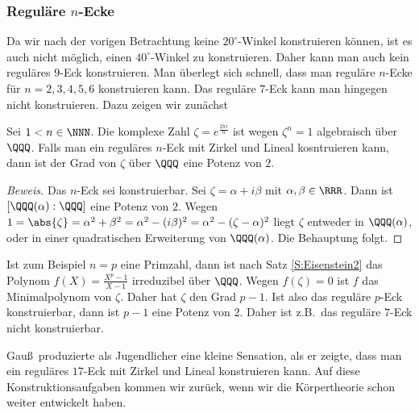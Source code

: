 \documentclass[12pt,a4paper,twoside]{article}
\begin{document}
\subsubsection{Regul\"are $n$-Ecke}
Da wir nach der vorigen Betrachtung keine $20^\circ$-Winkel konstruieren
k\"onnen, ist es auch nicht m\"oglich, einen $40^\circ$-Winkel zu
konstruieren. Daher kann man auch kein regul\"ares $9$-Eck konstruieren. Man
\"uberlegt sich schnell, dass man regul\"are $n$-Ecke f\"ur $n=2,3,4,5,6$
konstruieren kann. Das regul\"are $7$-Eck kann man hingegen nicht
konstruieren. Dazu zeigen wir zun\"achst
\begin{Lemma}\label{L:nEck}
  Sei $1<n\in\NNN$. Die komplexe Zahl $\zeta=e^{\frac{2\pi i}{n}}$ ist wegen
  $\zeta^n=1$ algebraisch \"uber $\QQQ$. Falls man ein regul\"ares $n$-Eck mit
  Zirkel und Lineal kosntruieren kann, dann ist der Grad von $\zeta$ \"uber
  $\QQQ$ eine Potenz von $2$.
\end{Lemma}
\begin{proof}[Beweis]
  Das $n$-Eck sei konstruierbar. Sei $\zeta=\alpha+i\beta$ mit
  $\alpha,\beta\in\RRR$. Dann ist $[\QQQ(\alpha):\QQQ]$ eine Potenz von $2$.
  Wegen $1=\abs{\zeta}=\alpha^2+\beta^2=\alpha^2-(i\beta)^2=
  \alpha^2-(\zeta-\alpha)^2$ liegt $\zeta$ entweder in $\QQQ(\alpha)$, oder in
  einer quadratischen Erweiterung von $\QQQ(\alpha)$. Die Behauptung folgt.
\end{proof}
Ist zum Beispiel $n=p$ eine Primzahl, dann ist nach Satz \ref{S:Eisenstein2}
das Polynom $f(X)=\frac{X^p-1}{X-1}$ irreduzibel \"uber $\QQQ$. Wegen
$f(\zeta)=0$ ist $f$ das Minimalpolynom von $\zeta$. Daher hat $\zeta$ den
Grad $p-1$. Ist also das regul\"are $p$-Eck konstruierbar, dann ist $p-1$ eine
Potenz von $2$. Daher ist z.B.\ das regul\"are $7$-Eck nicht konstruierbar.

Gau\ss\ produzierte als Jugendlicher eine kleine Sensation, als er zeigte,
dass man ein regul\"ares $17$-Eck mit Zirkel und Lineal konstruieren kann. Auf
diese Konstruktionsaufgaben kommen wir zur\"uck, wenn wir die K\"orpertheorie
schon weiter entwickelt haben.
\end{document}

